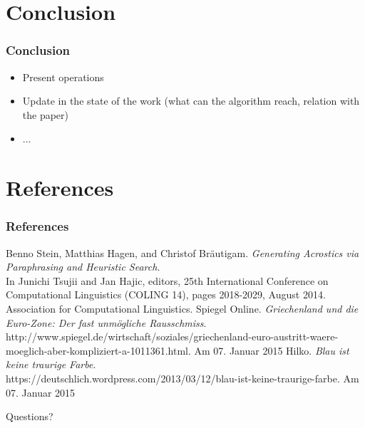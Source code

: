 \documentclass{beamer}
\begin{document}
\section{Conclusion}

\begin{frame}
\frametitle{Conclusion}
\begin{itemize}
\item Present operations
\item Update in the state of the work (what can the algorithm reach, relation with the paper)
\item ...
\end{itemize}
\end{frame}

\section{References}

\begin{frame}
\frametitle{References}
\scriptsize
\begin{thebibliography}{1}
	Benno Stein, Matthias Hagen, and Christof Bräutigam. \emph{Generating Acrostics via Paraphrasing and Heuristic Search}. \\
	In Junichi Tsujii and Jan Hajic, editors, 25th International Conference on Computational Linguistics (COLING 14), pages 2018-2029, August 2014. Association for Computational Linguistics.
	Spiegel Online. \emph{Griechenland und die Euro-Zone: Der fast unmögliche Rausschmiss}. \\
	http://www.spiegel.de/wirtschaft/soziales/griechenland-euro-austritt-waere-moeglich-aber-kompliziert-a-1011361.html. Am 07. Januar 2015
	Hilko. \emph{Blau ist keine traurige Farbe}. \\
	https://deutschlich.wordpress.com/2013/03/12/blau-ist-keine-traurige-farbe. Am 07. Januar 2015
\end{thebibliography}
\end{frame}

\begin{frame}
\Huge{\centerline{Questions?}}
\end{frame}

\end{document}
